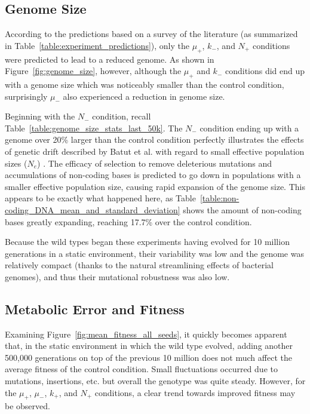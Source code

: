 \subsection{Genome Size}

According to the predictions based on a survey of the literature (as summarized in Table~\ref{table:experiment_predictions}), only the $\mu_+$, $k_-$, and $N_+$ conditions were predicted to lead to a reduced genome. As shown in Figure~\ref{fig:genome_size}, however, although the $\mu_+$ and $k_-$ conditions did end up with a genome size which was noticeably smaller than the control condition, surprisingly $\mu_-$ also experienced a reduction in genome size. %

Beginning with the $N_-$ condition, recall Table~\ref{table:genome_size_stats_last_50k}. The $N_-$ condition ending up with a genome over 20\% larger than the control condition perfectly illustrates the effects of genetic drift described by Batut et al. with regard to small effective population sizes ($N_e$) \cite{Batut.2014}. The efficacy of selection to remove deleterious mutations and accumulations of non-coding bases is predicted to go down in populations with a smaller effective population size, causing rapid expansion of the genome size. This appears to be exactly what happened here, as Table~\ref{table:non-coding_DNA_mean_and_standard_deviation} shows the amount of non-coding bases greatly expanding, reaching 17.7\% over the control condition. 

Because the wild types began these experiments having evolved for 10 million generations in a static environment, their variability was low and the genome was relatively compact (thanks to the natural streamlining effects of bacterial genomes), and thus their mutational robustness was also low. 

\subsection{Metabolic Error and Fitness}
Examining Figure~\ref{fig:mean_fitness_all_seeds}, it quickly becomes apparent that, in the static environment in which the wild type evolved, adding another 500,000 generations on top of the previous 10 million does not much affect the average fitness of the control condition. Small fluctuations occurred due to mutations, insertions, etc. but overall the genotype was quite steady. However, for the $\mu_+$, $\mu_-$, $k_+$, and $N_+$ conditions, a clear trend towards improved fitness may be observed.


